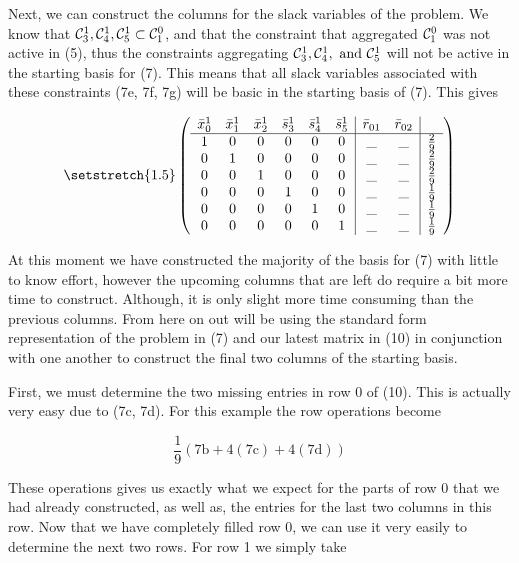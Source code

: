 \documentclass[11pt]{article} %
\newcommand{\cC}{{\cal C}}
\begin{document}
	 Next, we can construct the columns for the slack variables of the problem.  We know that $\cC_3^1, \cC_4^1, \cC_5^1 \subset \cC_1^0$, and that the constraint that aggregated $\cC_1^0$ was not active in (5), thus the constraints aggregating $\cC_3^1, \cC_4^1, \ \text{and} \  \cC_5^1$ will not be active in the starting basis for (7).  This means that all slack variables associated with these constraints (7e, 7f, 7g) will be basic in the starting basis of (7).  This gives
	 
	\begin{equation}\setstretch{1.5}
	\begin{pmatrix}
	\begin{array}{cccccc|cc|c}
		\bar{x}^1_0 & \bar{x}^1_1 & \bar{x}^1_2 & \bar{s}^1_3 & \bar{s}^1_4 & \bar{s}^1_5 & \bar{r}_{01} & \bar{r}_{02} \\
	\hline
	1 & 0 & 0 & 0 & 0 & 0 & \_ & \_ & \frac{2}{9} \\ 
	0 & 1 & 0 & 0 & 0 & 0 & \_ & \_ & \frac{2}{9} \\ 
	0 & 0 & 1 & 0 & 0 & 0 & \_ & \_ & \frac{2}{9} \\ 
	0 & 0 & 0 & 1 & 0 & 0 & \_ & \_ & \frac{1}{9} \\ 
	0 & 0 & 0 & 0 & 1 & 0 & \_ & \_ & \frac{1}{9} \\
	0 & 0 & 0 & 0 & 0 & 1 & \_ & \_ & \frac{1}{9} \\
	\end{array}
	\end{pmatrix}
	\end{equation}
	
	At this moment we have constructed the majority of the basis for (7) with little to know effort, however the upcoming columns that are left do require a bit more time to construct.  Although, it is only slight more time consuming than the previous columns.  From here on out will be using the standard form representation of the problem in (7) and our latest matrix in (10) in conjunction with one another to construct the final two columns of the starting basis.	
	
	First, we must determine the two missing entries in row 0 of (10).  This is actually very easy due to (7c, 7d).  For this example the row operations become
	
	\begin{equation}
	\frac{1}{9}(7\text{b} + 4(7\text{c}) + 4(7\text{d}))
	\end{equation}   
	
	These operations gives us exactly what we expect for the parts of row 0 that we had already constructed, as well as, the entries for the last two columns in this row.  Now that we have completely filled row 0, we can use it very easily to determine the next two rows.  For row 1 we simply take
	
\end{document}
